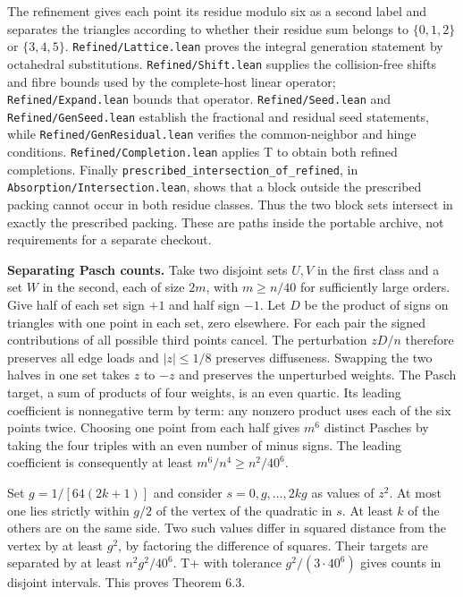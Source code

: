 \documentclass[english,11pt,a4paper]{article}
\begin{document}
The refinement gives each point its residue modulo six as a second label and separates the triangles according to whether their residue sum belongs to \(\{0,1,2\}\) or \(\{3,4,5\}\). \texttt{Refined/\allowbreak{}Lattice.\allowbreak{}lean} proves the integral generation statement by octahedral substitutions. \texttt{Refined/\allowbreak{}Shift.\allowbreak{}lean} supplies the collision-free shifts and fibre bounds used by the complete-host linear operator; \texttt{Refined/\allowbreak{}Expand.\allowbreak{}lean} bounds that operator. \texttt{Refined/\allowbreak{}Seed.\allowbreak{}lean} and \texttt{Refined/\allowbreak{}Gen\allowbreak{}Seed.\allowbreak{}lean} establish the fractional and residual seed statements, while \texttt{Refined/\allowbreak{}Gen\allowbreak{}Residual.\allowbreak{}lean} verifies the common-neighbor and hinge conditions. \texttt{Refined/\allowbreak{}Completion.\allowbreak{}lean} applies T to obtain both refined completions. Finally \texttt{prescribed\_\allowbreak{}intersection\_\allowbreak{}of\_\allowbreak{}refined}, in \texttt{Absorption/\allowbreak{}Intersection.\allowbreak{}lean}, shows that a block outside the prescribed packing cannot occur in both residue classes. Thus the two block sets intersect in exactly the prescribed packing. These are paths inside the portable archive, not requirements for a separate checkout.

\textbf{Separating Pasch counts.} Take two disjoint sets \(U,V\) in the first class and a set \(W\) in the second, each of size \(2m\), with \(m\ge n/40\) for sufficiently large orders. Give half of each set sign \(+1\) and half sign \(-1\). Let \(D\) be the product of signs on triangles with one point in each set, zero elsewhere. For each pair the signed contributions of all possible third points cancel. The perturbation \(zD/n\) therefore preserves all edge loads and \(|z|\le1/8\) preserves diffuseness. Swapping the two halves in one set takes \(z\) to \(-z\) and preserves the unperturbed weights. The Pasch target, a sum of products of four weights, is an even quartic. Its leading coefficient is nonnegative term by term: any nonzero product uses each of the six points twice. Choosing one point from each half gives \(m^6\) distinct Pasches by taking the four triples with an even number of minus signs. The leading coefficient is consequently at least \(m^6/n^4\ge n^2/40^6\).

Set \(g=1/[64(2k+1)]\) and consider \(s=0,g,\ldots,2kg\) as values of \(z^2\). At most one lies strictly within \(g/2\) of the vertex of the quadratic in \(s\). At least \(k\) of the others are on the same side. Two such values differ in squared distance from the vertex by at least \(g^2\), by factoring the difference of squares. Their targets are separated by at least \(n^2g^2/40^6\). T+ with tolerance \(g^2/(3\cdot40^6)\) gives counts in disjoint intervals. This proves Theorem 6.3.
\end{document}
